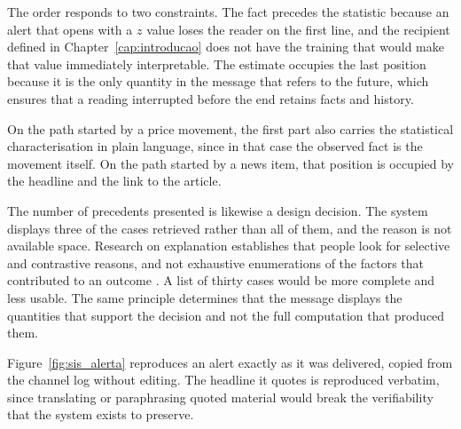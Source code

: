 The order responds to two constraints. The fact precedes the statistic because an alert that opens
with a $z$ value loses the reader on the first line, and the recipient defined in
Chapter~\ref{cap:introducao} does not have the training that would make that value immediately
interpretable. The estimate occupies the last position because it is the only quantity in the
message that refers to the future, which ensures that a reading interrupted before the end retains
facts and history.

On the path started by a price movement, the first part also carries the statistical
characterisation in plain language, since in that case the observed fact is the movement itself. On
the path started by a news item, that position is occupied by the headline and the link to the
article.

The number of precedents presented is likewise a design decision. The system displays three of the
cases retrieved rather than all of them, and the reason is not available space. Research on explanation
establishes that people look for selective and contrastive reasons, and not exhaustive enumerations
of the factors that contributed to an outcome \autocite{miller2019explanation}. A list of thirty
cases would be more complete and less usable. The same principle determines that the message
displays the quantities that support the decision and not the full computation that produced
them.

Figure~\ref{fig:sis_alerta} reproduces an alert exactly as it was delivered, copied from the
channel log without editing. The headline it quotes is reproduced verbatim, since translating or
paraphrasing quoted material would break the verifiability that the system exists to preserve.

